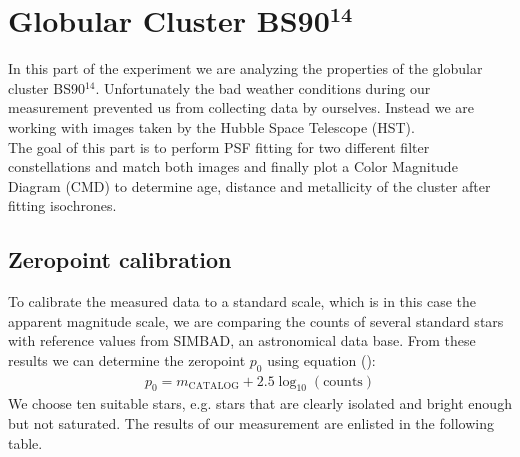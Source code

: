 \chapter{Globular Cluster BS90$^{\mathbf{14}}$}
In this part of the experiment we are analyzing the properties of the globular cluster BS90$^{14}$. Unfortunately the bad weather conditions during our measurement prevented us from collecting data by ourselves. Instead we are working with images taken by the Hubble Space Telescope (HST). \\
The goal of this part is to perform PSF fitting for two different filter constellations and match both images and finally plot a Color Magnitude Diagram (CMD) to determine age, distance and metallicity of the cluster after fitting isochrones.
\section{Zeropoint calibration}
To calibrate the measured data to a standard scale, which is in this case the apparent magnitude scale, we are comparing the counts of several standard stars with reference values from SIMBAD, an astronomical data base. From these results we can determine the zeropoint $p_0$ using equation (): %
	\begin{align}
		p_0 = m_{\text{CATALOG}} + 2.5\log_{10}(\text{counts})
	\end{align}
	We choose ten suitable stars, e.g. stars that are clearly isolated and bright enough but not saturated. The results of our measurement are enlisted in the following table.
	
